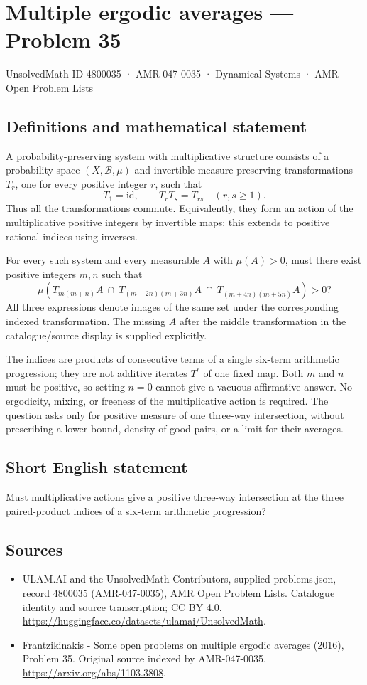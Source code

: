 \documentclass[11pt,a4paper]{article}
\begin{document}
\section*{Multiple ergodic averages — Problem 35}\label{4800035}
{\small UnsolvedMath ID 4800035 · AMR-047-0035 · Dynamical Systems · AMR Open Problem Lists}
\subsection{Definitions and mathematical statement}
A probability-preserving system with multiplicative
structure consists of a probability space
$(X,\mathcal B,\mu)$ and invertible
measure-preserving transformations $T_r$, one
for every positive integer $r$, such that
\[
                  T_1=\mathrm{id},\qquad
                  T_rT_s=T_{rs}\quad(r,s\ge1).
\]
Thus all the transformations commute. Equivalently,
they form an action of the multiplicative positive
integers by invertible maps; this extends to
positive rational indices using inverses.

For every such system and every measurable
$A$ with $\mu(A)>0$, must there exist
positive integers $m,n$ such that
\[
 \mu\left(
 T_{m(m+n)}A\ \cap\ T_{(m+2n)(m+3n)}A\ \cap\
 T_{(m+4n)(m+5n)}A
 \right)>0?
\]
All three expressions denote images of the
same set under the corresponding indexed
transformation. The missing $A$ after the
middle transformation in the catalogue/source
display is supplied explicitly.

The indices are products of consecutive terms
of a single six-term arithmetic progression;
they are not additive iterates $T^r$ of
one fixed map. Both $m$ and $n$ must
be positive, so setting $n=0$ cannot give
a vacuous affirmative answer. No ergodicity,
mixing, or freeness of the multiplicative
action is required. The question asks only
for positive measure of one three-way
intersection, without prescribing a lower
bound, density of good pairs, or a limit
for their averages.
\subsection{Short English statement}
Must multiplicative actions give a positive three-way intersection at the three paired-product indices of a six-term arithmetic progression?
\subsection{Sources}
\begin{itemize}
\item[S1] ULAM.AI and the UnsolvedMath Contributors, supplied problems.json, record 4800035 (AMR-047-0035), AMR Open Problem Lists. Catalogue identity and source transcription; CC BY 4.0.
\url{https://huggingface.co/datasets/ulamai/UnsolvedMath}.
\item[S2] Frantzikinakis - Some open problems on multiple ergodic averages (2016), Problem 35. Original source indexed by AMR-047-0035.
\url{https://arxiv.org/abs/1103.3808}.
\end{itemize}
\end{document}
